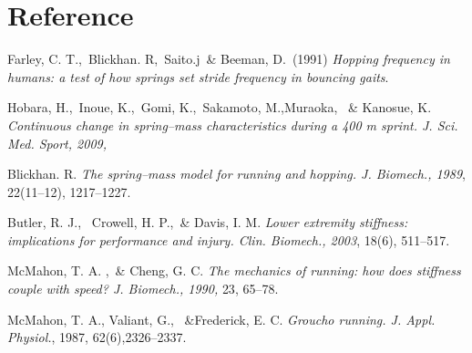 \documentclass[extendedabs]{AAVL}
\begin{document}
\section{Reference}
\begin{thebibliography}{}
  Farley, C. T.,\ Blickhan. R,\  Saito.j\ \& Beeman, D.\ (1991) {\it  Hopping frequency in humans: a test of how springs set stride frequency in bouncing gaits}.
  
Hobara, H.,\ Inoue, K.,\ Gomi, K.,\ Sakamoto, M.,Muraoka, \ \& Kanosue, K. {\it Continuous change in spring–mass characteristics during a 400 m sprint. J. Sci. Med. Sport, 2009,}

Blickhan. R. {\it The spring–mass model for running and hopping. J. Biomech., 1989}, {22(11–12), 1217–1227.} 

Butler, R. J., \ Crowell, H. P.,\ \& Davis, I. M. {\it  Lower extremity stiffness: implications for performance and injury. Clin. Biomech., 2003}, { 18(6), 511–517.}

McMahon, T. A. ,\ \& Cheng, G. C.  {\it The mechanics
of running: how does stiffness couple with speed? J. Biomech., 1990, 
}{23},{ 65–78.}

McMahon, T. A., Valiant, G., \ \&Frederick, E. C. {\it Groucho running. J. Appl. Physiol.}, {1987, 62(6),2326–2337}.

\end{thebibliography}
\end{document}
